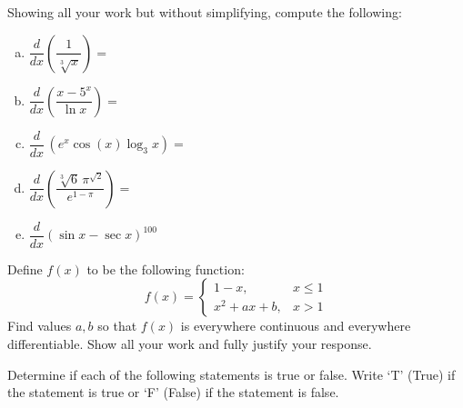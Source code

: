 \documentclass[12pt,letterpaper]{exam}
\begin{document}
\begin{questions}
\newpage
\question[15] Showing all your work but without simplifying, compute the following: \pvspace{0.3cm}

        \begin{enumerate}[(a)]
        \item $\dfrac{d}{dx} \left( \dfrac{1}{\sqrt[3]{x}} \right)=$ \vfill
        \item $\dfrac{d}{dx} \left( \dfrac{x - 5^x}{\ln x} \right)=$ \vfill
        \item $\dfrac{d}{dx}\, (e^x \cos(x) \log_3 x)=$ \vfill
        \item $\dfrac{d}{dx} \left( \dfrac{\sqrt[3]{6}\, \pi^{\sqrt{2}}}{e^{1 - \pi}} \right)=$ \vfill
        \item $\dfrac{d}{dx} (\sin x - \sec x)^{100}$ \vfill
        \end{enumerate}



\newpage
\question[10] Define $f(x)$ to be the following function:
	\[
	f(x)= 
	\begin{cases}
	1 - x, & x \leq 1 \\
	x^2 + ax + b, & x > 1
	\end{cases}
	\]
Find values $a, b$ so that $f(x)$ is everywhere continuous and everywhere differentiable. Show all your work and fully justify your response. 



\newpage
\question[10] Determine if each of the following statements is true or false. Write `T' (True) if the statement is true or `F' (False) if the statement is false. \pvspace{0.5cm}


\end{questions}
\end{document}
